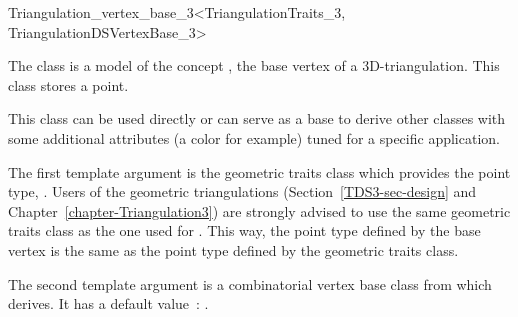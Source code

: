 

\begin{ccRefClass}{Triangulation_vertex_base_3<TriangulationTraits_3, TriangulationDSVertexBase_3>}

\ccDefinition

The class  is a model of the concept
, the base vertex of a 3D-triangulation.
This class stores a point.

This class can be used directly or can serve as a base to derive other classes
with some additional attributes (a color for example) tuned for a specific
application.


\ccParameters

The first template argument is the geometric traits class
 which provides the point type, .
Users of the geometric triangulations (Section~\ref{TDS3-sec-design} and
Chapter~\ref{chapter-Triangulation3}) are strongly advised to use the same
geometric traits class  as the one used for
.  This way, the point type defined by the base vertex is
the same as the point type defined by the geometric traits class.

The second template argument is a combinatorial vertex base class from which
 derives.
It has a default value~: .

\ccIsModel {}

\ccInheritsFrom {}

\ccTypes

\ccThreeToTwo
{}

\ccSeeAlso

\\
\\



\end{ccRefClass}
